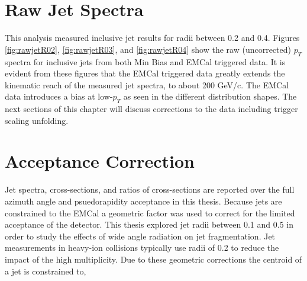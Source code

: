 \section{Raw Jet Spectra}

This analysis measured inclusive jet results for radii between 0.2 and 0.4.  Figures \ref{fig:rawjetR02}, \ref{fig:rawjetR03}, and \ref{fig:rawjetR04} show the raw (uncorrected) $p_{T}$ spectra for inclusive jets from both Min Bias and EMCal triggered data.  It is evident from these figures that the EMCal triggered data greatly extends the kinematic reach of the measured jet spectra, to about 200 GeV/c.  The EMCal data introduces a bias at low-$p_{T}$ as seen in the different distribution shapes.  The next sections of this chapter will discuss corrections to the data including trigger scaling unfolding. 



\section{Acceptance Correction}
Jet spectra, cross-sections, and ratios of cross-sections are reported over the full azimuth angle and psuedorapidity acceptance in this thesis.  Because jets are constrained to the EMCal a geometric factor was used to correct for the limited acceptance of the detector.  This thesis explored jet radii between 0.1 and 0.5 in order to study the effects of wide angle radiation on jet fragmentation.  Jet measurements in heavy-ion collisions typically use radii of 0.2 to reduce the impact of the high multiplicity.  Due to these geometric corrections the centroid of a jet is constrained to,

